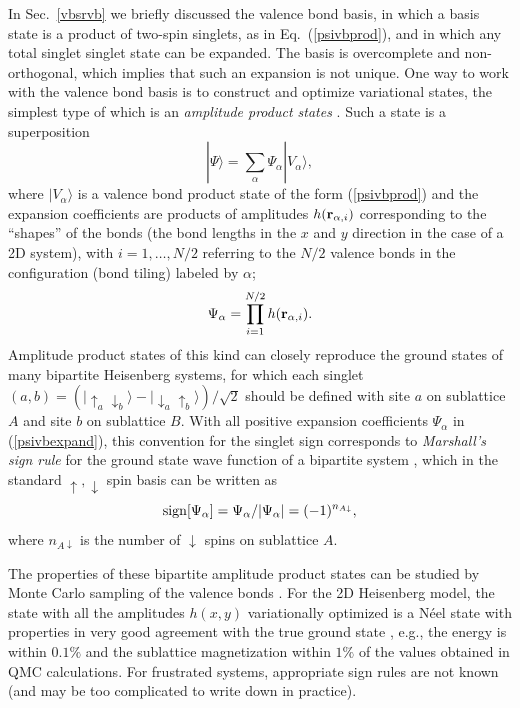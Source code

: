\documentclass[draft,numberedheadings]{aipproc}
\newcommand{\dn}{\downarrow}
\newcommand{\up}{\uparrow}
\begin{document}
In Sec.~\ref{vbsrvb} we briefly discussed the valence bond basis, in which a basis state is a product of two-spin singlets, as in Eq.~(\ref{psivbprod}), 
and in which any total singlet singlet state can be expanded. The basis is overcomplete and non-orthogonal, which implies that such an expansion is not 
unique. One way to work with the valence bond basis is to construct and optimize variational states, the simplest type of which is an {\it amplitude 
product states} \cite{liang1}. Such a state is a superposition 
\begin{equation}
|\Psi\rangle = \sum_\alpha \Psi_\alpha |V_\alpha\rangle,
\label{psivbexpand}
\end{equation}
where $|V_\alpha\rangle$ is a valence bond product state of the form (\ref{psivbprod}) and the expansion coefficients are products of amplitudes 
$h({\bf r}_{\alpha,i})$ corresponding to the ``shapes'' of the bonds (the bond lengths in the $x$ and $y$ direction in the case of a 2D system), 
with $i=1,\ldots,N/2$ referring to the $N/2$ valence bonds in the configuration (bond tiling) labeled by $\alpha$;
\begin{equation}
\Psi_\alpha =\prod_{i=1}^{N/2} h({\bf r}_{\alpha,i}).
\end{equation}
Amplitude product states of this kind can closely reproduce the ground states of many bipartite Heisenberg systems, for which each singlet 
$(a,b)=(|\up_a\dn_b\rangle-|\dn_a\up_b\rangle)/\sqrt{2}$ should be defined with site $a$ on sublattice $A$ and site $b$ on sublattice $B$. With 
all positive expansion coefficients $\Psi_\alpha$ in (\ref{psivbexpand}), this convention for the singlet sign corresponds to {\it Marshall's sign 
rule} for the ground state wave function of a bipartite system \cite{marshall55}, which in the standard $\up,\dn$ spin basis can be written as
\begin{equation}
{\rm sign}[\Psi_\alpha]=\Psi_\alpha/|\Psi_\alpha|=(-1)^{n_{A\dn}},
\end{equation}
where $n_{A\dn}$ is the number of $\dn$ spins on sublattice $A$. 

The properties of these bipartite amplitude product states can be studied by Monte Carlo sampling of the valence bonds \cite{liang1,lou07,awshg}. For the 
2D Heisenberg model, the state with all the amplitudes $h(x,y)$ variationally optimized is a N\'eel state with properties in very good agreement with 
the true ground state \cite{lou07}, e.g., the energy is within $0.1\%$ and the sublattice magnetization within $1\%$ of the values obtained in QMC 
calculations. For frustrated systems, appropriate sign rules are not known (and may be too complicated to write down in practice).
\end{document}
